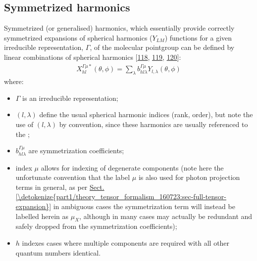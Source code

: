 \documentclass[letterpaper,table,10pt,english]{jupyterBook}
\begin{document}
\subsection{Symmetrized harmonics}
\label{\detokenize{part1/theory_observables_intro_100723:symmetrized-harmonics}}\label{\detokenize{part1/theory_observables_intro_100723:sec-theory-sym-harm-into}}
\sphinxAtStartPar
Symmetrized (or generalised) harmonics, which essentially provide correctly symmetrized expansions of spherical harmonics (\(Y_{LM}\)) functions for a given irreducible representation, \(\Gamma\), of the molecular point\sphinxhyphen{}group can be defined by linear combinations of spherical harmonics {[}\hyperlink{cite.backmatter/bibliography:id507}{118}, \hyperlink{cite.backmatter/bibliography:id508}{119}, \hyperlink{cite.backmatter/bibliography:id554}{120}{]}:
\begin{equation}\label{equation:part1/theory_observables_intro_100723:eq:symHarm-defn}
\begin{split}
X_{hl}^{\Gamma\mu*}(\theta,\phi)=\sum_{\lambda}b_{hl\lambda}^{\Gamma\mu}Y_{l,\lambda}(\theta,\phi)
\end{split}
\end{equation}
\sphinxAtStartPar
where:
\begin{itemize}
\item {} 
\sphinxAtStartPar
\(\Gamma\) is an irreducible representation;

\item {} 
\sphinxAtStartPar
\((l, \lambda)\) define the usual spherical harmonic indices (rank, order), but note the use of \((l, \lambda)\) by convention, since these harmonics are usually referenced to the {\hyperref[\detokenize{backmatter/glossary:term-MF}]{}};

\item {} 
\sphinxAtStartPar
\(b_{hl\lambda}^{\Gamma\mu}\) are symmetrization coefficients;

\item {} 
\sphinxAtStartPar
index \(\mu\) allows for indexing of degenerate components (note here the unfortunate convention that the label \(\mu\) is also used for photon projection terms in general, as per \hyperref[\detokenize{part1/theory_tensor_formalism_160723:sec-full-tensor-expansion}]{Sect.\@ \ref{\detokenize{part1/theory_tensor_formalism_160723:sec-full-tensor-expansion}}} \sphinxhyphen{} in ambiguous cases the symmetrization term will instead be labelled herein as \(\mu_X\), although in many cases may actually be redundant and safely dropped from the symmetrization coefficients);

\item {} 
\sphinxAtStartPar
\(h\) indexes cases where multiple components are required with all other quantum numbers identical.

\end{itemize}
\end{document}
